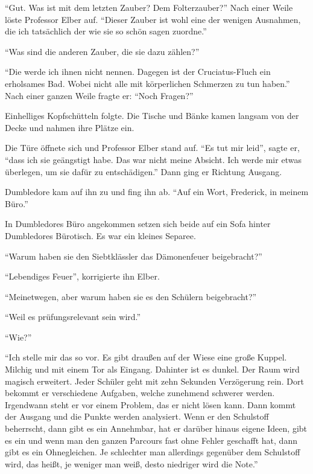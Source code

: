 \enquote{Gut. Was ist mit dem letzten Zauber? Dem Folterzauber?} Nach einer Weile löste Professor Elber auf. \enquote{Dieser Zauber ist wohl eine der wenigen Ausnahmen, die ich tatsächlich der \gst wie sie so schön sagen \gst {} zuordne.}

\enquote{Was sind die anderen Zauber, die sie dazu zählen?}

\enquote{Die werde ich ihnen nicht nennen. Dagegen ist der Cruciatus-Fluch ein erholsames Bad. Wobei nicht alle mit körperlichen Schmerzen zu tun haben.} Nach einer ganzen Weile fragte er: \enquote{Noch Fragen?}

Einhelliges Kopfschütteln folgte. Die Tische und Bänke kamen langsam von der Decke und nahmen ihre Plätze ein.

Die Türe öffnete sich und Professor Elber stand auf. \enquote{Es tut mir leid}, sagte er, \enquote{dass ich sie geängstigt habe. Das war nicht meine Absicht. Ich werde mir etwas überlegen, um sie dafür zu entschädigen.} Dann ging er Richtung Ausgang.

Dumbledore kam auf ihn zu und fing ihn ab. \enquote{Auf ein Wort, Frederick, in meinem Büro.}

In Dumbledores Büro angekommen setzen sich beide auf ein Sofa hinter Dumbledores Bürotisch. Es war ein kleines Separee.

\enquote{Warum haben sie den Siebtklässler das Dämonenfeuer beigebracht?}

\enquote{Lebendiges Feuer}, korrigierte ihn Elber.

\enquote{Meinetwegen, aber warum haben sie es den Schülern beigebracht?}

\enquote{Weil es prüfungsrelevant sein wird.}

\enquote{Wie?}

\enquote{Ich stelle mir das so vor. Es gibt draußen auf der Wiese eine große Kuppel. Milchig und mit einem Tor als Eingang. Dahinter ist es dunkel. Der Raum wird magisch erweitert. Jeder Schüler geht mit zehn Sekunden Verzögerung rein. Dort bekommt er verschiedene Aufgaben, welche zunehmend schwerer werden. Irgendwann steht er vor einem Problem, das er nicht lösen kann. Dann kommt der Ausgang und die Punkte werden analysiert. Wenn er den Schulstoff beherrscht, dann gibt es ein Annehmbar, hat er darüber hinaus eigene Ideen, gibt es ein  und wenn man den ganzen Parcours fast ohne Fehler geschafft hat, dann gibt es ein Ohnegleichen. Je schlechter man allerdings gegenüber dem Schulstoff wird, das heißt, je weniger man weiß, desto niedriger wird die Note.}


